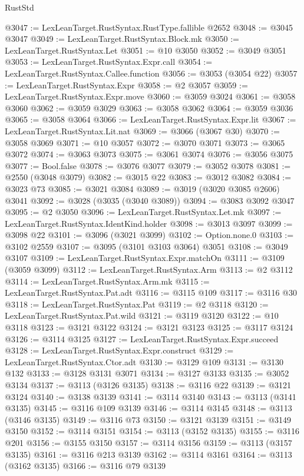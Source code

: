\begin{lexlean}{RustStd}
\begin{coremodule}
@3047 := LexLeanTarget.RustSyntax.RustType.fallible @2652
@3048 := @3045 @3047
@3049 := LexLeanTarget.RustSyntax.Block.mk
@3050 := LexLeanTarget.RustSyntax.Let
@3051 := @10 @3050
@3052 := @3049 @3051
@3053 := LexLeanTarget.RustSyntax.Expr.call
@3054 := LexLeanTarget.RustSyntax.Callee.function
@3056 := @3053 (@3054 @22)
@3057 := LexLeanTarget.RustSyntax.Expr
@3058 := @2 @3057
@3059 := LexLeanTarget.RustSyntax.Expr.move
@3060 := @3059 @3024
@3061 := @3058 @3060
@3062 := @3059 @3029
@3063 := @3058 @3062
@3064 := @3059 @3036
@3065 := @3058 @3064
@3066 := LexLeanTarget.RustSyntax.Expr.lit
@3067 := LexLeanTarget.RustSyntax.Lit.nat
@3069 := @3066 (@3067 @30)
@3070 := @3058 @3069
@3071 := @10 @3057
@3072 := @3070 @3071
@3073 := @3065 @3072
@3074 := @3063 @3073
@3075 := @3061 @3074
@3076 := @3056 @3075
@3077 := Bool.false
@3078 := @3076 @3077
@3079 := @3052 @3078
@3081 := @2550 (@3048 @3079)
@3082 := @3015 @22
@3083 := @3012 @3082
@3084 := @3023 @73
@3085 := @3021 @3084
@3089 := @3019 (@3020 @3085 @2606) @3041
@3092 := @3028 (@3035 (@3040 @3089))
@3094 := @3083 @3092 @3047
@3095 := @2 @3050
@3096 := LexLeanTarget.RustSyntax.Let.mk
@3097 := LexLeanTarget.RustSyntax.IdentKind.holder
@3098 := @3013 @3097
@3099 := @3098 @22
@3101 := @3096 (@3021 @3099)
@3102 := Option.none.{0}
@3103 := @3102 @2559
@3107 := @3095 (@3101 @3103 @3064) @3051
@3108 := @3049 @3107
@3109 := LexLeanTarget.RustSyntax.Expr.matchOn
@3111 := @3109 (@3059 @3099)
@3112 := LexLeanTarget.RustSyntax.Arm
@3113 := @2 @3112
@3114 := LexLeanTarget.RustSyntax.Arm.mk
@3115 := LexLeanTarget.RustSyntax.Pat.adt
@3116 := @3115 @109
@3117 := @3116 @30
@3118 := LexLeanTarget.RustSyntax.Pat
@3119 := @2 @3118
@3120 := LexLeanTarget.RustSyntax.Pat.wild
@3121 := @3119 @3120
@3122 := @10 @3118
@3123 := @3121 @3122
@3124 := @3121 @3123
@3125 := @3117 @3124
@3126 := @3114 @3125
@3127 := LexLeanTarget.RustSyntax.Expr.succeed
@3128 := LexLeanTarget.RustSyntax.Expr.construct
@3129 := LexLeanTarget.RustSyntax.Ctor.adt
@3130 := @3129 @109
@3131 := @3130 @132
@3133 := @3128 @3131 @3071
@3134 := @3127 @3133
@3135 := @3052 @3134
@3137 := @3113 (@3126 @3135)
@3138 := @3116 @22
@3139 := @3121 @3124
@3140 := @3138 @3139
@3141 := @3114 @3140
@3143 := @3113 (@3141 @3135)
@3145 := @3116 @109 @3139
@3146 := @3114 @3145
@3148 := @3113 (@3146 @3135)
@3149 := @3116 @73
@3150 := @3121 @3139
@3151 := @3149 @3150
@3152 := @3114 @3151
@3154 := @3113 (@3152 @3135)
@3155 := @3116 @201
@3156 := @3155 @3150
@3157 := @3114 @3156
@3159 := @3113 (@3157 @3135)
@3161 := @3116 @213 @3139
@3162 := @3114 @3161
@3164 := @3113 (@3162 @3135)
@3166 := @3116 @79 @3139

\end{coremodule}
\end{lexlean}

